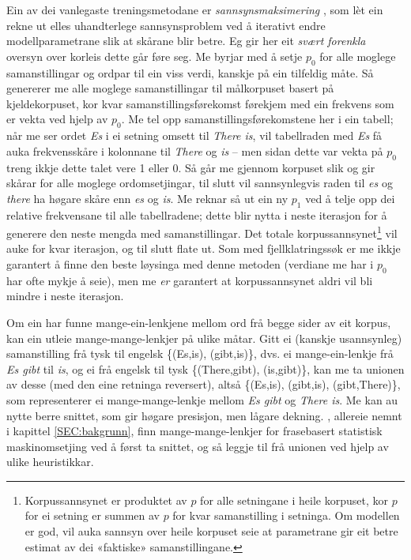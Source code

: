 \documentclass[12pt,a4paper,oneside,draft]{report}
\begin{document}
 Ein av dei vanlegaste treningsmetodane er \emph{sannsynsmaksimering}
 \citep[utførleg forklart i][]{prescher-em}, som lèt ein rekne ut
 elles uhandterlege sannsynsproblem ved å iterativt endre
 modellparametrane slik at skårane blir betre. Eg gir her eit \emph{svært  forenkla} oversyn over korleis dette går føre seg. Me byrjar med å
 setje $p_0$ for alle moglege samanstillingar og ordpar til ein viss
 verdi, kanskje på ein tilfeldig måte. Så genererer me alle moglege
 samanstillingar til målkorpuset basert på kjeldekorpuset, kor kvar
 samanstillingsførekomst førekjem med ein frekvens som er vekta ved
 hjelp av $p_0$. Me tel opp samanstillingsførekomstene her i ein
 tabell; når me ser ordet \emph{Es} i ei setning omsett til \emph{There is}, vil
 tabellraden med \emph{Es} få auka frekvensskåre i kolonnane til \emph{There} og
 \emph{is} -- men sidan dette var vekta på $p_0$ treng ikkje dette talet
 vere 1 eller 0. Så går me gjennom korpuset slik og gir skårar for
 alle moglege ordomsetjingar, til slutt vil sannsynlegvis raden til
 \emph{es} og \emph{there} ha høgare skåre enn \emph{es} og \emph{is}. Me reknar så ut ein
 ny $p_1$ ved å telje opp dei relative frekvensane til alle
 tabellradene; dette blir nytta i neste iterasjon for å generere den
 neste mengda med samanstillingar. Det totale korpussannsynet\footnote{Korpussannsynet er produktet av $p$ for alle setningane i
        heile korpuset, kor $p$ for ei setning er summen av $p$ for
        kvar samanstilling i setninga. Om modellen er god, vil auka
        sannsyn over heile korpuset seie at parametrane gir eit betre
        estimat av dei «faktiske» samanstillingane. }
 vil auke for kvar iterasjon, og til slutt flate ut. Som med
 fjellklatringssøk er me ikkje garantert å finne den beste løysinga
 med denne metoden (verdiane me har i $p_0$ har ofte mykje å seie),
 men me \emph{er} garantert at korpussannsynet aldri vil bli mindre i neste
 iterasjon.

 Om ein har funne mange-ein-lenkjene mellom ord frå begge sider av eit
 korpus, kan ein utleie mange-mange-lenkjer på ulike måtar. Gitt ei
 (kanskje usannsynleg) samanstilling frå tysk til engelsk
 \{(Es,is), (gibt,is)\}, dvs. ei mange-ein-lenkje frå \emph{Es gibt} til
 \emph{is}, og ei frå engelsk til tysk \{(There,gibt), (is,gibt)\}, kan me
 ta unionen av desse (med den eine retninga reversert), altså
 \{(Es,is), (gibt,is), (gibt,There)\}, som representerer ei
 mange-mange-lenkje mellom \emph{Es gibt} og \emph{There is}. Me kan au nytte
 berre snittet, som gir høgare presisjon, men lågare dekning.
 \citet{koehn2003spb}, allereie nemnt i kapittel \ref{SEC:bakgrunn},
 finn mange-mange-lenkjer for frasebasert statistisk maskinomsetjing
 ved å først ta snittet, og så leggje til frå unionen ved hjelp av
 ulike heuristikkar.
\end{document}
